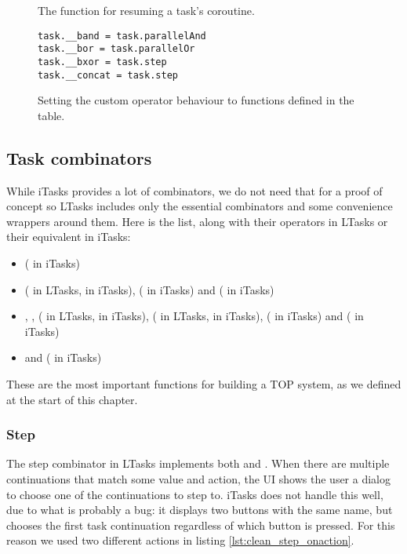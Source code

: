 \begin{figure}[ht]
\centering
\inputminted[linenos, firstline=310, lastline=327]{lua}{code/task.lua}
\vspace{-\baselineskip}
\caption{The  function for resuming a task's coroutine.}
\label{lst:ltasks_task.resume}
\end{figure}

\begin{figure}[ht]
\centering
\begin{verbatim}
task.__band = task.parallelAnd
task.__bor = task.parallelOr
task.__bxor = task.step
task.__concat = task.step
\end{verbatim}
\vspace{-\baselineskip}
\caption{Setting the custom operator behaviour to functions defined in the  table.}
\label{lst:ltasks_operators_definition}
\end{figure}

\subsection{Task combinators}\label{section-ltasks-combinators}
While iTasks provides a lot of combinators, we do not need that for a proof of concept so LTasks includes only the essential combinators and some convenience wrappers around them. Here is the list, along with their operators in LTasks or their equivalent in iTasks:
\begin{itemize}
    \item {} ( in iTasks)
    \item {} (\lua{~} in LTasks, \clean{>>*} in iTasks),  (\clean{>>-} in iTasks) and \linebreak {} ( in iTasks)
    \item {}, ,  (\lua{&} in LTasks, \clean{-&&-} in iTasks),  (\lua{|} in LTasks, \clean{-||-} in iTasks),  (\clean{-||} in iTasks) and  (\clean{||-} in iTasks)
    \item {} and  ( in iTasks)
\end{itemize}

These are the most important functions for building a TOP system, as we defined at the start of this chapter.

\subsubsection{Step}
The step combinator in LTasks implements both  and . When there are multiple continuations that match some value and action, the UI shows the user a dialog to choose one of the continuations to step to. iTasks does not handle this well, due to what is probably a bug: it displays two buttons with the same name, but chooses the first task continuation regardless of which button is pressed. For this reason we used two different actions in listing \ref{lst:clean_step_onaction}.

